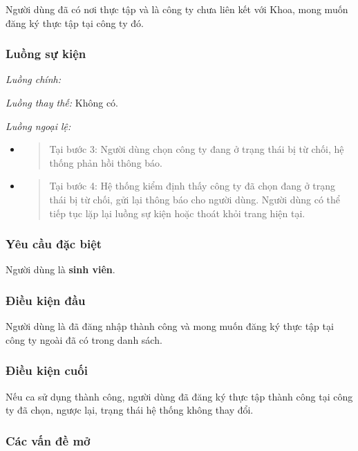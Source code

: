 \documentclass[./../main.tex]{subfiles}
\begin{document}
Người dùng đã có nơi thực tập và là công ty chưa liên kết với Khoa, mong
muốn đăng ký thực tập tại công ty đó.

\subsubsection*{Luồng sự kiện}

\emph{Luồng chính:}

\emph{Luồng thay thế:} Không có.

\emph{Luồng ngoại lệ:}

\begin{itemize}
\item
  \begin{quote}
  Tại bước 3: Người dùng chọn công ty đang ở trạng thái bị từ chối, hệ
  thống phản hồi thông báo.
  \end{quote}
\item
  \begin{quote}
  Tại bước 4: Hệ thống kiểm định thấy công ty đã chọn đang ở trạng thái
  bị từ chối, gửi lại thông báo cho người dùng. Người dùng có thể tiếp
  tục lặp lại luồng sự kiện hoặc thoát khỏi trang hiện tại.
  \end{quote}
\end{itemize}

\subsubsection*{Yêu cầu đặc biệt}

Người dùng là \textbf{sinh viên}.

\subsubsection*{Điều kiện đầu}

Người dùng là đã đăng nhập thành công và mong muốn đăng ký thực tập tại
công ty ngoài đã có trong danh sách.

\subsubsection*{Điều kiện cuối}

Nếu ca sử dụng thành công, người dùng đã đăng ký thực tập thành công tại
công ty đã chọn, ngược lại, trạng thái hệ thống không thay đổi.

\subsubsection*{Các vấn đề mở}
\end{document}
